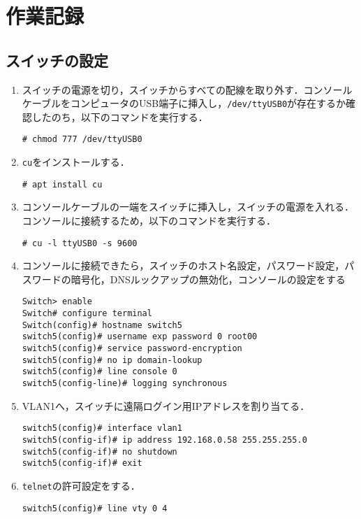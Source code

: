 \section{作業記録}
\subsection{スイッチの設定}
\begin{enumerate}
    \renewcommand{\labelenumi}{\textbf{\theenumi.}\ }
    \item スイッチの電源を切り，スイッチからすべての配線を取り外す．コンソールケーブルをコンピュータのUSB端子に挿入し，\texttt{/dev/ttyUSB0}が存在するか確認したのち，以下のコマンドを実行する．
          \begin{lstlisting}
# chmod 777 /dev/ttyUSB0 
    \end{lstlisting}
    \item \texttt{cu}をインストールする．
          \begin{lstlisting}
# apt install cu            
        \end{lstlisting}
    \item コンソールケーブルの一端をスイッチに挿入し，スイッチの電源を入れる．コンソールに接続するため，以下のコマンドを実行する．
          \begin{lstlisting}
# cu -l ttyUSB0 -s 9600                
            \end{lstlisting}
    \item コンソールに接続できたら，スイッチのホスト名設定，パスワード設定，パスワードの暗号化，DNSルックアップの無効化，コンソールの設定をする
          \begin{lstlisting}
Switch> enable
Switch# configure terminal
Switch(config)# hostname switch5
switch5(config)# username exp password 0 root00
switch5(config)# service password-encryption
switch5(config)# no ip domain-lookup
switch5(config)# line console 0
switch5(config-line)# logging synchronous
\end{lstlisting}
    \item VLAN1へ，スイッチに遠隔ログイン用IPアドレスを割り当てる．
          \begin{lstlisting}
switch5(config)# interface vlan1
switch5(config-if)# ip address 192.168.0.58 255.255.255.0
switch5(config-if)# no shutdown
switch5(config-if)# exit
\end{lstlisting}
    \item \texttt{telnet}の許可設定をする．
          \begin{lstlisting}
switch5(config)# line vty 0 4

\end{lstlisting}
\end{enumerate}
